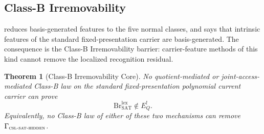 \documentclass[11pt]{article}
\newcommand{\EQbang}{E^{!}_{Q}}
\newcommand{\CSLSATHidden}{\Gamma_{\textsc{csl-sat-hidden}}}
\newtheorem{theorem}{Theorem}[section]
\theoremstyle{definition}
\begin{document}
\subsection{Class-B Irremovability}
\label{subsec:class-b:irremovability}

 reduces basis-generated
features to the five normal classes, and
 says that intrinsic features of
the standard fixed-presentation carrier are basis-generated.  The
consequence is the Class-B Irremovability barrier: carrier-feature
methods of this kind cannot remove the localized recognition residual.

\begin{theorem}[Class-B Irremovability Core]
\label{thm:pvnp:irremovability-core}
No quotient-mediated or joint-access-mediated Class-B law on the
standard fixed-presentation polynomial current carrier can prove
\[
  \mathrm{Br}^{\mathrm{lex}}_{\mathrm{SAT}}\notin\EQbang .
\]
Equivalently, no Class-B law of either of these two mechanisms can
remove \textnormal{\(\CSLSATHidden\)}.
\end{theorem}
\end{document}
